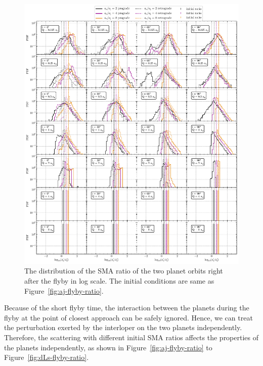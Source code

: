 \documentclass[twocolumn]{aastex63}
\newcommand*\fgr[1]{Figure~\ref{#1}}
\begin{document}
\begin{figure}
    \includegraphics[width=\textwidth]{figs/ratio-flyby-ratio.pdf}
    \caption{The distribution of the SMA ratio of the two planet orbits right after the flyby in log scale. The initial conditions are same as \fgr{fig:aj-flyby-ratio}.} 
    \label{fig:ratio-flyby-ratio}
\end{figure}

Because of the short flyby time, the interaction between the planets during the flyby at the point of closest approach can be safely ignored. Hence, we can treat the perturbation exerted by the interloper on the two planets independently. Therefore, the scattering with different initial SMA ratios affects the properties of the planets independently, as shown in \fgr{fig:aj-flyby-ratio} to \fgr{fig:dLs-flyby-ratio}.
\end{document}
